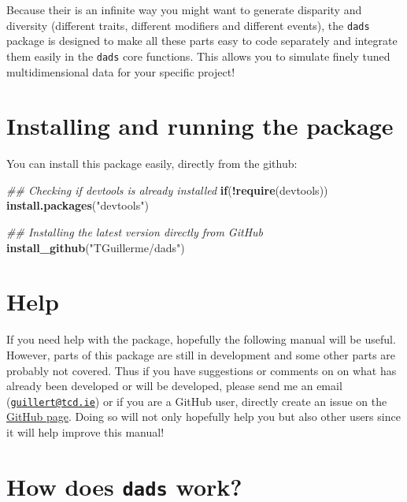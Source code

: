 \documentclass[]{book}
\newenvironment{Shaded}{\begin{snugshade}}{\end{snugshade}}
\newcommand{\CommentTok}[1]{\textcolor[rgb]{0.56,0.35,0.01}{\textit{#1}}}
\newcommand{\ControlFlowTok}[1]{\textcolor[rgb]{0.13,0.29,0.53}{\textbf{#1}}}
\newcommand{\KeywordTok}[1]{\textcolor[rgb]{0.13,0.29,0.53}{\textbf{#1}}}
\newcommand{\NormalTok}[1]{#1}
\newcommand{\OperatorTok}[1]{\textcolor[rgb]{0.81,0.36,0.00}{\textbf{#1}}}
\newcommand{\StringTok}[1]{\textcolor[rgb]{0.31,0.60,0.02}{#1}}
\begin{document}
Because their is an infinite way you might want to generate disparity and diversity (different traits, different modifiers and different events), the \texttt{dads} package is designed to make all these parts easy to code separately and integrate them easily in the \texttt{dads} core functions.
This allows you to simulate finely tuned multidimensional data for your specific project!

\hypertarget{installing-and-running-the-package}{%
\section{Installing and running the package}\label{installing-and-running-the-package}}

You can install this package easily, directly from the github:

\begin{Shaded}
\begin{Highlighting}[]
\CommentTok{## Checking if devtools is already installed}
\ControlFlowTok{if}\NormalTok{(}\OperatorTok{!}\KeywordTok{require}\NormalTok{(devtools)) }\KeywordTok{install.packages}\NormalTok{(}\StringTok{"devtools"}\NormalTok{)}

\CommentTok{## Installing the latest version directly from GitHub}
\KeywordTok{install_github}\NormalTok{(}\StringTok{"TGuillerme/dads"}\NormalTok{)}
\end{Highlighting}
\end{Shaded}

\hypertarget{help}{%
\section{Help}\label{help}}

If you need help with the package, hopefully the following manual will be useful.
However, parts of this package are still in development and some other parts are probably not covered.
Thus if you have suggestions or comments on on what has already been developed or will be developed, please send me an email (\href{mailto:guillert@tcd.ie}{\nolinkurl{guillert@tcd.ie}}) or if you are a GitHub user, directly create an issue on the \href{https://github.com/TGuillerme/dads}{GitHub page}.
Doing so will not only hopefully help you but also other users since it will help improve this manual!

\hypertarget{how-does-dads-work}{%
\section{\texorpdfstring{How does \texttt{dads} work?}{How does dads work?}}\label{how-does-dads-work}}
\end{document}
